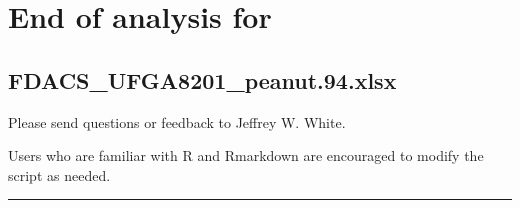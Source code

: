 \documentclass[
]{article}
\begin{document}
\section{End of analysis for}\label{end-of-analysis-for}

\subsection{FDACS\_UFGA8201\_peanut.94.xlsx}\label{fdacs_ufga8201_peanut.94.xlsx}

Please send questions or feedback to Jeffrey W. White.

Users who are familiar with R and Rmarkdown are encouraged to modify the
script as needed.

\begin{center}\rule{0.5\linewidth}{0.5pt}\end{center}
\end{document}
